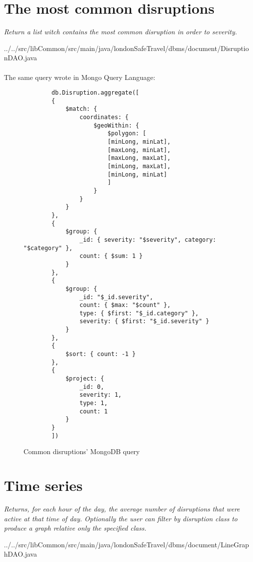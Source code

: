 \section{The most common disruptions}
\textit{Return a list witch contains the most common disruption in order to severity.}


{../../src/libCommon/src/main/java/londonSafeTravel/dbms/document/DisruptionDAO.java}

\paragraph{}
The same query wrote in Mongo Query Language:
\begin{figure}[H]
	\begin{lstlisting}
		db.Disruption.aggregate([
		{
			$match: {
				coordinates: {
					$geoWithin: {
						$polygon: [
						[minLong, minLat],
						[maxLong, minLat],
						[maxLong, maxLat],
						[minLong, maxLat],
						[minLong, minLat]
						]
					}
				}
			}
		},
		{
			$group: {
				_id: { severity: "$severity", category: "$category" },
				count: { $sum: 1 }
			}
		},
		{
			$group: {
				_id: "$_id.severity",
				count: { $max: "$count" },
				type: { $first: "$_id.category" },
				severity: { $first: "$_id.severity" }
			}
		},
		{
			$sort: { count: -1 }
		},
		{
			$project: {
				_id: 0,
				severity: 1,
				type: 1,
				count: 1
			}
		}
		])
	\end{lstlisting}
	\caption{Common disruptions' MongoDB query}
\end{figure}

\section{Time series}
\textit{Returns, for each hour of the day, the average number of disruptions that were active at that time of day. Optionally the user can filter by disruption class to produce a graph relative only the specified class.}


{../../src/libCommon/src/main/java/londonSafeTravel/dbms/document/LineGraphDAO.java}

